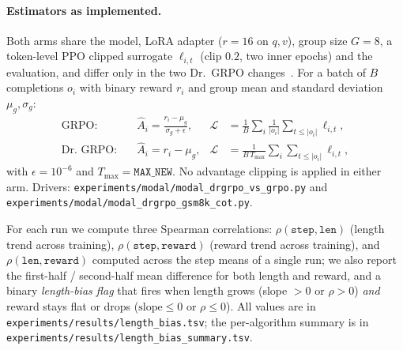 \paragraph{Estimators as implemented.}
Both arms share the model, LoRA adapter ($r{=}16$ on $q,v$), group size
$G{=}8$, a token-level PPO clipped surrogate $\ell_{i,t}$ (clip $0.2$,
two inner epochs) and the evaluation, and differ only in the two
Dr.~GRPO changes~\cite{tong2025drgrpo}. For a batch of $B$ completions
$o_i$ with binary reward $r_i$ and group mean and standard deviation
$\mu_g,\sigma_g$:
\begin{align*}
\text{GRPO:}\quad & \hat A_i = \frac{r_i-\mu_g}{\sigma_g+\epsilon}, &
\mathcal L &= \frac{1}{B}\sum_i \frac{1}{|o_i|}\sum_{t\le |o_i|}\ell_{i,t},\\
\text{Dr.~GRPO:}\quad & \hat A_i = r_i-\mu_g, &
\mathcal L &= \frac{1}{B\,T_{\max}}\sum_i \sum_{t\le |o_i|}\ell_{i,t},
\end{align*}
with $\epsilon=10^{-6}$ and $T_{\max}=\texttt{MAX\_NEW}$. No advantage
clipping is applied in either arm. Drivers:
\texttt{experiments/modal/modal\_drgrpo\_vs\_grpo.py} and
\texttt{experiments/modal/modal\_drgrpo\_gsm8k\_cot.py}.

For each run we compute three Spearman correlations:
$\rho(\texttt{step}, \texttt{len})$ (length trend across training),
$\rho(\texttt{step}, \texttt{reward})$ (reward trend across
training), and $\rho(\texttt{len}, \texttt{reward})$ computed across
the step means of a single run; we also report the
first-half / second-half mean difference for both length and
reward, and a binary \emph{length-bias flag} that fires when
length grows (slope $>0$ or $\rho>0$) \emph{and} reward stays flat
or drops ($\text{slope}\le 0$ or $\rho\le 0$). All values are in
\texttt{experiments/results/length\_bias.tsv}; the per-algorithm
summary is in
\texttt{experiments/results/length\_bias\_summary.tsv}.

